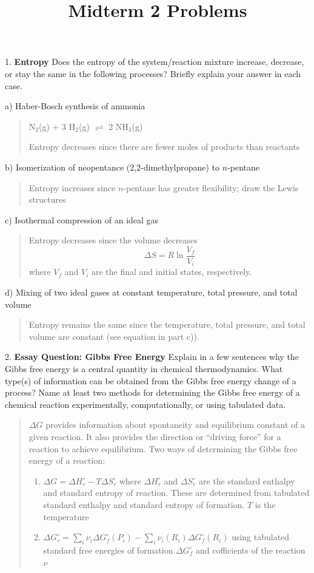 \documentclass[11pt]{article}
\title{\textbf{Midterm 2 Problems}}
\newcommand{\brian}[1]{
  {\begin{quote}
      \color{blue} #1
  \end{quote}}
}
\begin{document}
\maketitle

1. \textbf{Entropy} Does the entropy of the system/reaction mixture increase,
decrease, or stay the same in the following processes? Briefly explain your
answer in each case.

a) Haber-Bosch synthesis of ammonia

\brian{N$_2$(g) + 3 H$_2$(g) $\rightleftharpoons$ 2 NH$_3$(g)

  Entropy decreases since there are fewer moles of products than reactants
}

b) Isomerization of neopentance (2,2-dimethylpropane) to $n$-pentane

\brian{Entropy increases since $n$-pentane has greater flexibility; draw the
  Lewis structures
}

c) Isothermal compression of an ideal gas

\brian{Entropy decreases since the volume decreases
  \begin{equation*}
    \Delta S = R\ln\frac{V_f}{V_i}
  \end{equation*}
  where $V_f$ and $V_i$ are the final and initial states, respectively.
}

d) Mixing of two ideal gases at constant temperature, total pressure, and total volume

\brian{Entropy remains the same since the temperature, total pressure, and total volume
  are constant (see equation in part c)).}

2. \textbf{Essay Question: Gibbs Free Energy} Explain in a few sentences why the Gibbs
free energy is a central quantity in chemical thermodynamics. What type(s) of information
can be obtained from the Gibbs free energy change of a process? Name at least two methods
for determining the Gibbs free energy of a chemical reaction experimentally, computationally,
or using tabulated data.

\brian{$\Delta G$ provides information about spontaneity and equilibrium constant of a given
  reaction. It also provides the direction or ``driving force'' for a reaction to achieve
  equilibrium. Two ways of determining the Gibbs free energy of a reaction:
  \begin{enumerate}
  \item $\Delta G = \Delta H^\circ_r - T\Delta S^\circ_r$ where $\Delta H^\circ_r$ and $\Delta S^\circ_r$
    are the standard enthalpy and standard entropy of reaction. These are determined from tabulated
    standard enthalpy and standard entropy of formation. $T$ is the temperature
  \item $\Delta G^\circ_r = \sum_i \nu_i\Delta G^\circ_f(P_i)-\sum_i\nu_i(R_i)\Delta G^\circ_f(R_i)$
    using tabulated standard free energies of formation $\Delta G^\circ_f$ and cofficients of the reaction
    $\nu$
  \end{enumerate}
}
\end{document}
